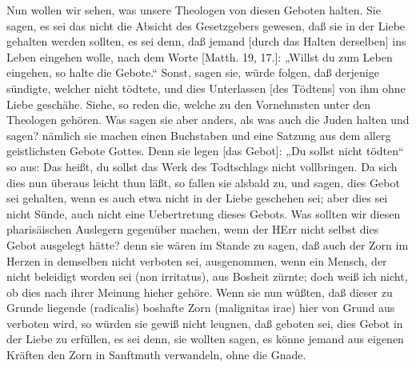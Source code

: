 Nun wollen wir sehen, was unsere Theologen von diesen Geboten halten. Sie sagen, es sei das nicht die Absicht des Gesetzgebers gewesen, daß sie in der Liebe gehalten werden sollten, es sei denn, daß jemand [durch das Halten derselben] ins Leben eingehen wolle, nach dem Worte [Matth. 19, 17.]: „Willst du zum Leben eingehen, so halte die Gebote.“ Sonst, sagen sie, würde folgen, daß derjenige sündigte, welcher nicht tödtete, und dies Unterlassen [des Tödtens] von ihm ohne Liebe geschähe. Siehe, so reden die, welche zu den Vornehmsten unter den Theologen gehören. Was sagen sie aber anders, als was auch die Juden halten und sagen? nämlich sie machen einen Buchstaben und eine Satzung aus dem allerg geistlichsten Gebote Gottes. Denn sie legen [das Gebot]: „Du sollst nicht tödten“ so aus: Das heißt, du sollst das Werk des Todtschlags nicht vollbringen. Da sich dies nun überaus leicht thun läßt, so fallen sie alsbald zu, und sagen, dies Gebot sei gehalten, wenn es auch etwa nicht in der Liebe geschehen sei; aber dies sei nicht Sünde, auch nicht eine Uebertretung dieses Gebots. Was sollten wir diesen pharisäischen Auslegern gegenüber machen, wenn der HErr nicht selbst dies Gebot ausgelegt hätte? denn sie wären im Stande zu sagen, daß auch der Zorn im Herzen in demselben nicht verboten sei, ausgenommen, wenn ein Mensch, der nicht beleidigt worden sei (non irritatus), aus Bosheit zürnte; doch weiß ich nicht, ob dies nach ihrer Meinung hieher gehöre. Wenn sie nun wüßten, daß dieser zu Grunde liegende (radicalis) boshafte Zorn (malignitas irae) hier von Grund aus verboten wird, so würden sie gewiß nicht leugnen, daß geboten sei, dies Gebot in der Liebe zu erfüllen, es sei denn, sie wollten sagen, es könne jemand aus eigenen Kräften den Zorn in Sanftmuth verwandeln, ohne die Gnade.

